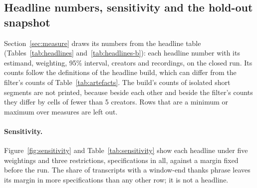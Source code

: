 \begin{table}[ht]
\centering
\small

\caption{Injected error (per cent) at which the cohort mean (Coh.), the median creator (Med.) and the 90th-percentile
creator (P90) move by 0.2 between-creator SD, with the bridge's edit profile and the same rate for every creator
($>$20: not reached within the injected range). The column headed \BridgeDisagreeMedianPct\% gives the shift, in
between-creator SD, at that error, the bridge's median-pair disagreement. ICC$_{20}$ is the ICC at 20\% injected error, a
simulation summary without interval. Last three columns: error that differs between creators and tracks the share of
time without speech, at a median of \BridgeDisagreeMedianPct\%: the Spearman correlation of creator means with the clean
ones ($\rho$), and the change of the creator-level correlation with the share without speech at medians of
\BridgeDisagreeMedianPct\% and 10\% ($\Delta\rho$). The P90 thresholds of filled pauses and MATTR-1000 lie below the
bridge's median-pair disagreement, that of word length just above it. Between-creator comparisons of word length, MATTR
and filled-pause rate carry the caveat of Section~\ref{sec:variance}.}
\label{tab:tolerance}
\end{table}

\subsection{Headline numbers, sensitivity and the hold-out snapshot}
\label{app:headlines}

Section~\ref{sec:measure} draws its numbers from the headline table (Tables~\ref{tab:headlines}
and~\ref{tab:headlines-b}): each headline number with its estimand, weighting, 95\% interval, creators and recordings,
on the closed run. Its counts follow the definitions of the headline build, which can differ from the filter's counts of
Table~\ref{tab:artefacts}. The build's counts of isolated short segments are not printed, because beside each other and
beside the filter's counts they differ by cells of fewer than 5 creators. Rows that are a minimum or maximum over
measures are left out.

\paragraph{Sensitivity.} Figure~\ref{fig:sensitivity} and Table~\ref{tab:sensitivity} show each headline under five
weightings and three restrictions, \RFourSpecs{} specifications in all, against a margin fixed before the run. The
share of transcripts with a window-end thanks phrase leaves its margin in more specifications than any other row; it is
not a headline.

